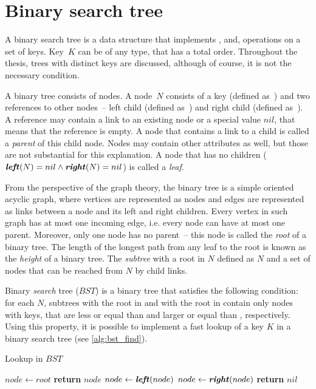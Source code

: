 
\section{Binary search tree}

A binary search tree is a data structure that implements \findop, \insertop and, \removeop operations on a set of keys. Key~$K$ can be of any type, that has a total order. Throughout the thesis, trees with distinct keys are discussed, although of course, it is not the necessary condition.

A binary tree consists of nodes. A node~$N$ consists of a key (defined as~) and two references to other nodes~-- left child (defined as~) and right child (defined as~). A reference may contain a link to an existing node or a special value $nil$, that means that the reference is empty. A node that contains a link to a child is called a \emph{parent} of this child node. Nodes may contain other attributes as well, but those are not substantial for this explanation. A node that has no children (\(\textbf{\textit{left}}(N) = nil \land \textbf{\textit{right}}(N) = nil\)) is called a \emph{leaf}.

From the perspective of the graph theory, the binary tree is a simple oriented acyclic graph, where vertices are represented as nodes and edges are represented as links between a node and its left and right children. Every vertex in such graph has at most one incoming edge, i.e. every node can have at most one parent. Moreover, only one node has no parent~-- this node is called the \emph{root} of a binary tree. The length of the longest path from any leaf to the root is known as the \emph{height} of a binary tree. The \emph{subtree} with a root in $N$ defined as $N$ and a set of nodes that can be reached from $N$ by child links.

Binary \emph{search} tree ($BST$) is a binary tree that satisfies the following condition: for each $N$, subtrees with the root in  and with the root in  contain only nodes with keys, that are less or equal than  and larger or equal than , respectively. Using this property, it is possible to implement a fast lookup of a key $K$ in a binary search tree (see \cref{alg:bst_find}).


\begin{algorithm}
\caption{Lookup in $BST$}\label{alg:bst_find}
\begin{algorithmic}[1]
    \State $node\gets root$
      \State \textbf{return} $node$
      \State $node \gets \textbf{\textit{left}}(node)$
    \Else {}
      \State $node \gets \textbf{\textit{right}}(node)$
    \EndIf
    \EndWhile
    \State \textbf{return} $nil$
  \EndProcedure
\end{algorithmic}
\end{algorithm}

